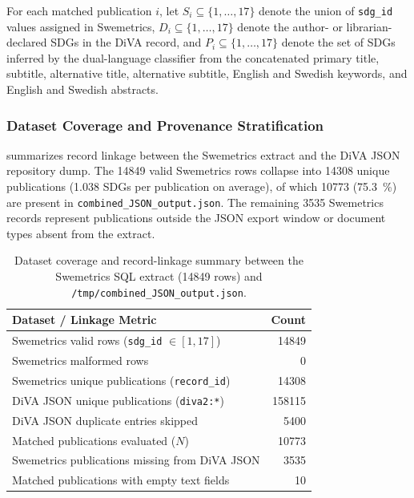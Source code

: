 For each matched publication $i$, let $S_i \subseteq \{1,\dots,17\}$ denote the union of \texttt{sdg\_id} values assigned in Swemetrics, $D_i \subseteq \{1,\dots,17\}$ denote the author- or librarian-declared \glspl{SDG} in the \gls{DiVA} record, and $P_i \subseteq \{1,\dots,17\}$ denote the set of \glspl{SDG} inferred by the dual-language classifier from the concatenated primary title, subtitle, alternative title, alternative subtitle, English and Swedish keywords, and English and Swedish abstracts.

\subsubsection{Dataset Coverage and Provenance Stratification}

 summarizes record linkage between the Swemetrics extract and the \gls{DiVA} \gls{JSON} repository dump. The \num{14849} valid Swemetrics rows collapse into \num{14308} unique publications (\num{1.038} \glspl{SDG} per publication on average), of which \num{10773} (\qty{75.3}{\percent}) are present in \texttt{combined\_JSON\_output.json}. The remaining \num{3535} Swemetrics records represent publications outside the JSON export window or document types absent from the extract.

\begin{table}[!ht]
  \centering
  \caption{Dataset coverage and record-linkage summary between the Swemetrics SQL extract (\num{14849} rows) and \texttt{/tmp/combined\_JSON\_output.json}.}
  \label{tab:swemetrics_coverage}
  \small
  \begin{tabular}{l r}
    \toprule
    \textbf{Dataset / Linkage Metric} & \textbf{Count} \\
    \midrule
    Swemetrics valid rows (\texttt{sdg\_id} $\in [1, 17]$) & \num{14849} \\
    \rowcolor{rowtint}
    Swemetrics malformed rows & \num{0} \\
    Swemetrics unique publications (\texttt{record\_id}) & \num{14308} \\
    \rowcolor{rowtint}
    \gls{DiVA} \gls{JSON} unique publications (\texttt{diva2:*}) & \num{158115} \\
    \gls{DiVA} \gls{JSON} duplicate entries skipped & \num{5400} \\
    \rowcolor{rowtint}
    Matched publications evaluated ($N$) & \num{10773} \\
    Swemetrics publications missing from \gls{DiVA} \gls{JSON} & \num{3535} \\
    \rowcolor{rowtint}
    Matched publications with empty text fields & \num{10} \\
    \bottomrule
  \end{tabular}
\end{table}
\FloatBarrier

